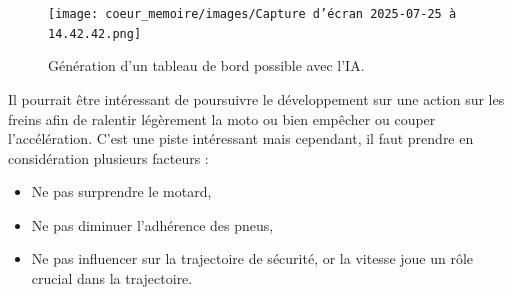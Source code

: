 \begin{figure}[H]
    \centering
    \texttt{[image: coeur\_memoire/images/Capture d’écran 2025-07-25 à 14.42.42.png]} 
    \caption{Génération d'un tableau de bord possible avec l'IA.}
\end{figure}

Il pourrait être intéressant de poursuivre le développement sur une action sur les freins afin de ralentir légèrement la moto ou bien empêcher ou couper l'accélération. C'est une piste intéressant  mais cependant, il faut prendre en considération plusieurs facteurs : 
\begin{itemize}
    \item Ne pas surprendre le motard,
    \item Ne pas diminuer l'adhérence des pneus,
    \item Ne pas influencer sur la trajectoire de sécurité, or la vitesse joue un rôle crucial dans la trajectoire.
\end{itemize}
